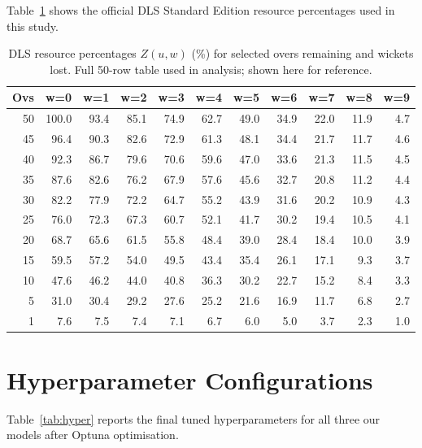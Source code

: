 \documentclass[10pt,a4paper,twocolumn]{article}
\begin{document}
Table~\ref{tab:dls_resources} shows the official DLS Standard Edition resource percentages used in this study.

\begin{table}[H]
\centering
\caption{DLS resource percentages $Z(u,w)$ (\%) for selected overs remaining and wickets lost. Full 50-row table used in analysis; shown here for reference.}
\label{tab:dls_resources}
{\tiny
\begin{tabular}{@{}r|rrrrrrrrrr@{}}
\toprule
\textbf{Ovs} & \textbf{w=0} & \textbf{w=1} & \textbf{w=2} & \textbf{w=3} & \textbf{w=4} & \textbf{w=5} & \textbf{w=6} & \textbf{w=7} & \textbf{w=8} & \textbf{w=9} \\
\midrule
50 & 100.0 & 93.4 & 85.1 & 74.9 & 62.7 & 49.0 & 34.9 & 22.0 & 11.9 & 4.7 \\
45 & 96.4 & 90.3 & 82.6 & 72.9 & 61.3 & 48.1 & 34.4 & 21.7 & 11.7 & 4.6 \\
40 & 92.3 & 86.7 & 79.6 & 70.6 & 59.6 & 47.0 & 33.6 & 21.3 & 11.5 & 4.5 \\
35 & 87.6 & 82.6 & 76.2 & 67.9 & 57.6 & 45.6 & 32.7 & 20.8 & 11.2 & 4.4 \\
30 & 82.2 & 77.9 & 72.2 & 64.7 & 55.2 & 43.9 & 31.6 & 20.2 & 10.9 & 4.3 \\
25 & 76.0 & 72.3 & 67.3 & 60.7 & 52.1 & 41.7 & 30.2 & 19.4 & 10.5 & 4.1 \\
20 & 68.7 & 65.6 & 61.5 & 55.8 & 48.4 & 39.0 & 28.4 & 18.4 & 10.0 & 3.9 \\
15 & 59.5 & 57.2 & 54.0 & 49.5 & 43.4 & 35.4 & 26.1 & 17.1 & 9.3  & 3.7 \\
10 & 47.6 & 46.2 & 44.0 & 40.8 & 36.3 & 30.2 & 22.7 & 15.2 & 8.4  & 3.3 \\
5  & 31.0 & 30.4 & 29.2 & 27.6 & 25.2 & 21.6 & 16.9 & 11.7 & 6.8  & 2.7 \\
1  & 7.6  & 7.5  & 7.4  & 7.1  & 6.7  & 6.0  & 5.0  & 3.7  & 2.3  & 1.0 \\
\bottomrule
\end{tabular}
}
\end{table}

\section{Hyperparameter Configurations}
\label{app:hyper}

Table~\ref{tab:hyper} reports the final tuned hyperparameters for all three our models after Optuna optimisation.
\end{document}
